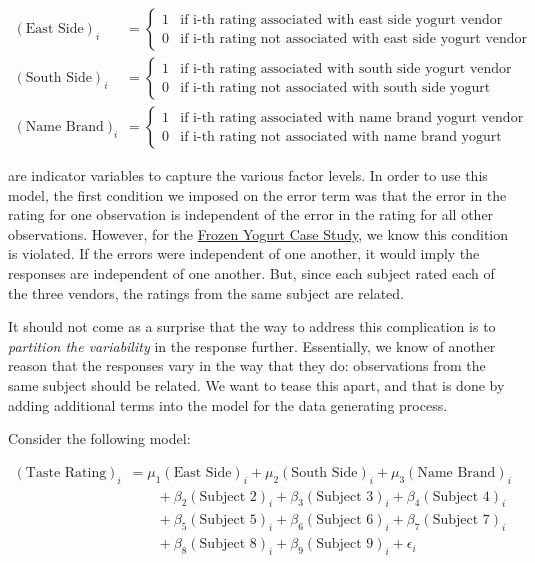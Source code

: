 \documentclass[
]{book}
\theoremstyle{plain}
\theoremstyle{mydefn}
\theoremstyle{myexmpl}
\theoremstyle{remark}
\begin{document}
\[
\begin{aligned}
  (\text{East Side})_i &= \begin{cases}
    1 & \text{if i-th rating associated with east side yogurt vendor} \\
    0 & \text{if i-th rating not associated with east side yogurt vendor}
    \end{cases} \\
  (\text{South Side})_i &= \begin{cases}
    1 & \text{if i-th rating associated with south side yogurt vendor} \\
    0 & \text{if i-th rating not associated with south side yogurt vendor}
    \end{cases} \\
  (\text{Name Brand})_i &= \begin{cases}
    1 & \text{if i-th rating associated with name brand yogurt vendor} \\
    0 & \text{if i-th rating not associated with name brand yogurt vendor}
    \end{cases}
\end{aligned}
\]

are indicator variables to capture the various factor levels. In order to use this model, the first condition we imposed on the error term was that the error in the rating for one observation is independent of the error in the rating for all other observations. However, for the \protect\hyperlink{CaseYogurt}{Frozen Yogurt Case Study}, we know this condition is violated. If the errors were independent of one another, it would imply the responses are independent of one another. But, since each subject rated each of the three vendors, the ratings from the same subject are related.

It should not come as a surprise that the way to address this complication is to \emph{partition the variability} in the response further. Essentially, we know of another reason that the responses vary in the way that they do: observations from the same subject should be related. We want to tease this apart, and that is done by adding additional terms into the model for the data generating process.

Consider the following model:

\[
\begin{aligned}
  (\text{Taste Rating})_i &= \mu_1 (\text{East Side})_i + \mu_2 (\text{South Side})_i + \mu_3 (\text{Name Brand})_i \\
    &\qquad + \beta_2 (\text{Subject 2})_i + \beta_3 (\text{Subject 3})_i + \beta_4 (\text{Subject 4})_i \\
    &\qquad + \beta_5 (\text{Subject 5})_i + \beta_6 (\text{Subject 6})_i + \beta_7 (\text{Subject 7})_i \\
    &\qquad + \beta_8 (\text{Subject 8})_i + \beta_9 (\text{Subject 9})_i + \epsilon_i
\end{aligned}
\]
\end{document}
